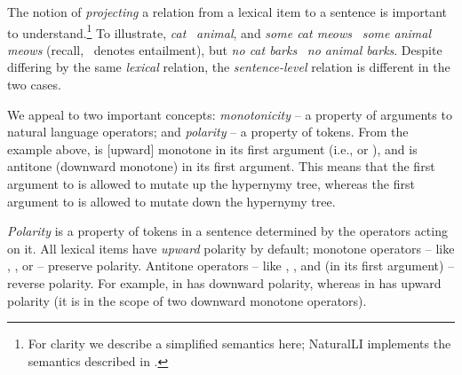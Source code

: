 %
%

The notion of \textit{projecting} a relation from a lexical item to
  a sentence is important to understand.\footnote{
    For clarity we describe a simplified semantics here; 
    NaturalLI implements the semantics described in 
    .
  }
To illustrate, \textit{cat} \forward\ \textit{animal},
  and \textit{some cat meows} \forward\ \textit{some animal meows}
  (recall, \forward\ denotes entailment),
  but
  \textit{no cat barks} \nforward\ \textit{no animal barks}.
Despite differing by the same \textit{lexical} relation,
  the \textit{sentence-level} relation is different in the two cases.

We appeal to two important concepts: \textit{monotonicity} -- a
  property of arguments to natural language operators;
  and \textit{polarity} -- a property of tokens.
From the example above,  is [upward] monotone in its first
  argument (i.e.,  or ), 
  and  is antitone (downward monotone) in its first argument.
This means that the first argument to  is allowed to mutate up the
  hypernymy tree, whereas the first argument to  is allowed to mutate
  down the hypernymy tree.

\textit{Polarity} is
  a property of tokens in a sentence determined by the
  operators acting on it.
All lexical items have \textit{upward} polarity by default;
  monotone operators -- like , , or  -- preserve polarity.
Antitone operators -- like , , and  (in its first argument) -- 
  reverse polarity.
For example,  in  has downward 
  polarity, whereas  in 
  has upward polarity
  (it is in the scope of two downward monotone operators).

